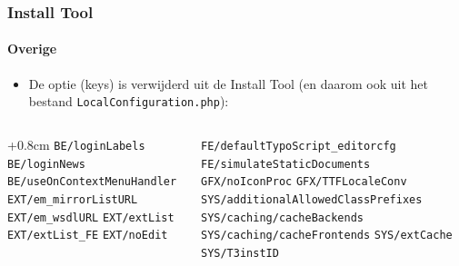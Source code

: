 \begin{frame}[fragile]
	\frametitle{Install Tool}
	\framesubtitle{Overige}

	\begin{itemize}
		\item De optie (keys) is verwijderd uit de Install Tool\newline
			(en daarom ook uit het bestand \texttt{LocalConfiguration.php}):
	\end{itemize}

	\begin{columns}[T]
		\begin{column}{.5\textwidth}
			\advance\leftskip+0.8cm
			\smaller
				\texttt{BE/loginLabels}\newline
				\texttt{BE/loginNews}\newline
				\texttt{BE/useOnContextMenuHandler}\newline
				\texttt{EXT/em\_mirrorListURL}\newline
				\texttt{EXT/em\_wsdlURL}\newline
				\texttt{EXT/extList}\newline
				\texttt{EXT/extList\_FE}\newline
				\texttt{EXT/noEdit}\newline
			\normalsize
		\end{column}
		\begin{column}{.5\textwidth}
			\smaller
				\texttt{FE/defaultTypoScript\_editorcfg}\newline
				\texttt{FE/simulateStaticDocuments}\newline
				\texttt{GFX/noIconProc}\newline
				\texttt{GFX/TTFLocaleConv}\newline
				\texttt{SYS/additionalAllowedClassPrefixes}\newline
				\texttt{SYS/caching/cacheBackends}\newline
				\texttt{SYS/caching/cacheFrontends}\newline
				\texttt{SYS/extCache}\newline
				\texttt{SYS/T3instID}\newline
			\normalsize
		\end{column}

	\end{columns}

\end{frame}


